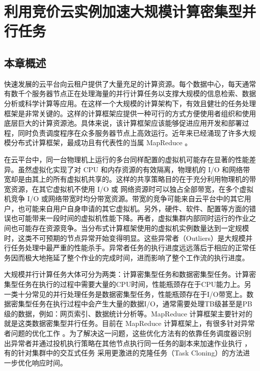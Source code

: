 \chapter{利用竞价云实例加速大规模计算密集型并行任务}
\label{cha:no2}

\section{本章概述}
\label{sec:no2_intro}
快速发展的云平台向云租户提供了大量充足的计算资源。每个数据中心，每天通常有数千个服务器节点正在处理海量的并行计算任务以支撑大规模的信息检索、数据分析或科学计算等应用。在这样一个大规模的计算架构下，有效且健壮的任务处理框架是非常关键的。这样的计算框架应提供一种可行的方式方便使用者组织和使用底层巨大的计算资源池。具体来说，该计算框架应该能够促进应用开发和部署过程，同时负责调度程序在众多服务器节点上高效运行。近年来已经涌现了许多大规模分布式计算框架，最成功且有代表性的当属 MapReduce \cite{Dean:2004:MSD:1251254.1251264}。

在云平台中，同一台物理机上运行的多台同样配置的虚拟机可能存在显著的性能差异。虽然虚拟化实现了对 CPU 和内存资源的有效隔离，物理机的 I/O 和网络带宽却是由其上的所有虚拟机共享的。这样的共享策略目的在于充分利用物理机的带宽资源，在其它虚拟机不使用 I/O 或 网络资源时可以独占全部带宽，在多个虚拟机竞争 I/O 或网络带宽时均分带宽资源。带宽的竞争可能来自云平台中的其它用户，也可能来自用户自身申请的其它虚拟机。另外，硬件、软件、配置等方面的错误也可能带来一段时间的虚拟机性能下降。再者，虚拟集群内部同时运行的作业之间也可能存在资源竞争。当分布式计算框架使用的虚拟机实例数量达到一定规模时，这类不可预期的节点异常开始变得明显。这些异常者（Outliers）是大规模并行任务处理中最严重的性能杀手。异常者任务的执行进度远远落后于相应的正常任务因而极大地拖延了整个作业的完成时间，进而影响了整个工作流的执行进度。

大规模并行计算任务大体可分为两类：计算密集型任务和数据密集型任务。计算密集型任务在执行的过程中需要大量的CPU时间，性能瓶颈存在于CPU能力上。另一类十分常见的并行处理任务是数据密集型任务，性能瓶颈存在于I/O带宽上。数据密集型任务在执行过程中会产生大量的数据I/O，通常需要处理TB级甚至是PB级的数据，例如：网页索引、数据统计分析等。MapReduce 计算框架主要针对的就是这类数据密集型并行任务。目前在 MapReduce 计算框架上，有很多针对异常者问题的优化工作 \cite{Zaharia:2008:IMP:1855741.1855744, Ananthanarayanan:2010:ROM:1924943.1924962, 180304, Dean:2013:TS:2408776.2408794}。为了解决这一问题，这些优化方法有的依靠任务调度器识别出异常者并通过投机执行策略在其他节点执行同一任务的副本来加速作业执行 \cite{Zaharia:2008:IMP:1855741.1855744, Ananthanarayanan:2010:ROM:1924943.1924962}，有的针对集群中的交互式任务 \cite{180304, Dean:2013:TS:2408776.2408794} 采用更激进的克隆任务（Task Cloning）的方法进一步优化响应时间。

